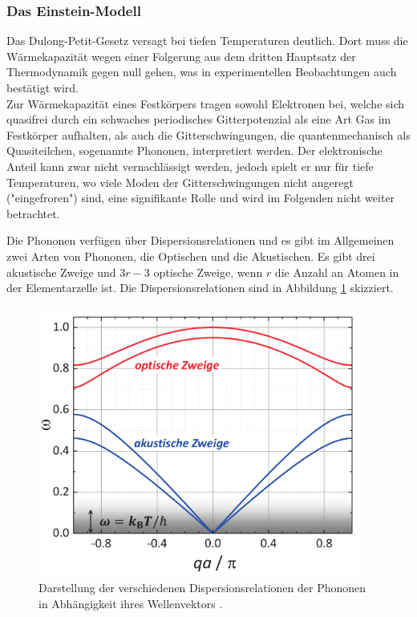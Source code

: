 \subsubsection{Das Einstein-Modell}
Das Dulong-Petit-Gesetz versagt bei tiefen Temperaturen deutlich. Dort muss die Wärmekapazität wegen einer Folgerung aus dem dritten Hauptsatz der Thermodynamik gegen null gehen, was in experimentellen Beobachtungen auch bestätigt wird.\\
Zur Wärmekapazität eines Festkörpers tragen sowohl Elektronen bei, welche sich quasifrei durch ein schwaches periodisches Gitterpotenzial als eine Art Gas im Festkörper aufhalten, als auch die Gitterschwingungen, die quantenmechanisch als Quasiteilchen, sogenannte Phononen, interpretiert werden. Der elektronische Anteil kann zwar nicht vernachlässigt werden, jedoch spielt er nur für tiefe Temperaturen, wo viele Moden der Gitterschwingungen nicht angeregt ("eingefroren") sind, eine signifikante Rolle und wird im Folgenden nicht weiter betrachtet.

Die Phononen verfügen über Dispersionsrelationen und es gibt im Allgemeinen zwei Arten von Phononen, die Optischen und die Akustischen. Es gibt drei akustische Zweige und $3r-3$ optische Zweige, wenn $r$ die Anzahl an Atomen in der Elementarzelle ist. Die Dispersionsrelationen sind in Abbildung \ref{fig:phononen} skizziert.

\begin{figure}
  \centering
  \includegraphics[width=300pt]{data/phononen.png}
  \caption{Darstellung der verschiedenen Dispersionsrelationen der Phononen in Abhängigkeit ihres Wellenvektors \cite{grossMarx}.}
  \label{fig:phononen}
\end{figure}

